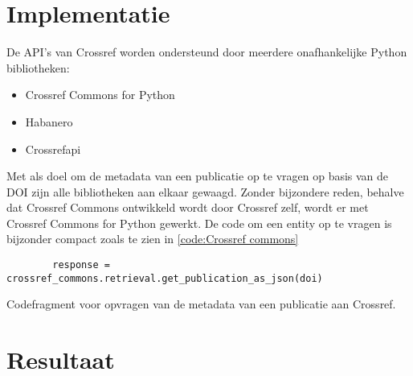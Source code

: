 \section{Implementatie}
De API's van Crossref worden ondersteund door meerdere onafhankelijke Python bibliotheken:
\begin{itemize}
    \item Crossref Commons for Python \autocite{Crossrefcommons2025}
    \item Habanero \autocite{Habanero2025}
    \item Crossrefapi \autocite{Crossrefapi2025}
\end{itemize}
Met als doel om de metadata van een publicatie op te vragen op basis van de DOI zijn alle bibliotheken aan elkaar gewaagd. Zonder bijzondere reden, behalve dat Crossref Commons ontwikkeld wordt door Crossref zelf, wordt er met Crossref Commons for Python gewerkt. De code om een entity op te vragen is bijzonder compact zoals te zien in \ref{code:Crossref commons}
\begin{listing}
    \begin{verbatim}
        response = crossref_commons.retrieval.get_publication_as_json(doi)
    \end{verbatim}
    \caption[Crossref commons codefragment]{Codefragment voor opvragen van de metadata van een publicatie aan Crossref.}
    \label{code:Crossref commons}
\end{listing}
\section{Resultaat}
\lipsum[1-2]


